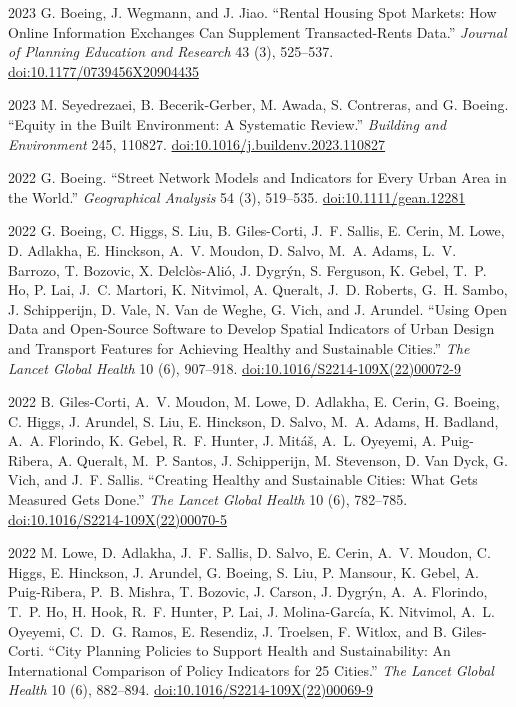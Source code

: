 \documentclass[11pt,letterpaper]{report} %
\begin{document}
\begin{tablist}
        \item[2023] \tab{}G. Boeing, J. Wegmann, and J. Jiao. \enquote{Rental Housing Spot Markets: How Online Information Exchanges Can Supplement Transacted-Rents Data.} \textit{Journal of Planning Education and Research} 43 (3), 525--537. \href{https://doi.org/10.1177/0739456X20904435}{doi:10.1177/0739456X20904435}

        \item[2023] \tab{}M. Seyedrezaei, B. Becerik-Gerber, M. Awada, S. Contreras, and G. Boeing. \enquote{Equity in the Built Environment: A Systematic Review.} \textit{Building and Environment} 245, 110827. \href{https://doi.org/10.1016/j.buildenv.2023.110827}{doi:10.1016/j.buildenv.2023.110827}

        \item[2022] \tab{}G. Boeing. \enquote{Street Network Models and Indicators for Every Urban Area in the World.} \textit{Geographical Analysis} 54 (3), 519--535. \href{https://doi.org/10.1111/gean.12281}{doi:10.1111/gean.12281}

        \item[2022] \tab{}G. Boeing, C. Higgs, S. Liu, B. Giles-Corti, J.~F. Sallis, E. Cerin, M. Lowe, D. Adlakha, E. Hinckson, A.~V. Moudon, D. Salvo, M.~A. Adams, L.~V. Barrozo, T. Bozovic, X. Delclòs-Alió, J. Dygrýn, S. Ferguson, K. Gebel, T.~P. Ho, P. Lai, J.~C. Martori, K. Nitvimol, A. Queralt, J.~D. Roberts, G.~H. Sambo, J. Schipperijn, D. Vale, N. Van de Weghe, G. Vich, and J. Arundel. \enquote{Using Open Data and Open-Source Software to Develop Spatial Indicators of Urban Design and Transport Features for Achieving Healthy and Sustainable Cities.} \textit{The Lancet Global Health} 10 (6), 907--918. \href{https://doi.org/10.1016/S2214-109X(22)00072-9}{doi:10.1016/S2214-109X(22)00072-9}

        \item[2022] \tab{}B. Giles-Corti, A.~V. Moudon, M. Lowe, D. Adlakha, E. Cerin, G. Boeing, C. Higgs, J. Arundel, S. Liu, E. Hinckson, D. Salvo, M.~A. Adams, H. Badland, A.~A. Florindo, K. Gebel, R.~F. Hunter, J. Mitáš, A.~L. Oyeyemi, A. Puig-Ribera, A. Queralt, M.~P. Santos, J. Schipperijn, M. Stevenson, D. Van Dyck, G. Vich, and J.~F. Sallis. \enquote{Creating Healthy and Sustainable Cities: What Gets Measured Gets Done.} \textit{The Lancet Global Health} 10 (6), 782--785. \href{https://doi.org/10.1016/S2214-109X(22)00070-5}{doi:10.1016/S2214-109X(22)00070-5}

        \item[2022] \tab{}M. Lowe, D. Adlakha, J.~F. Sallis, D. Salvo, E. Cerin, A.~V. Moudon, C. Higgs, E. Hinckson, J. Arundel, G. Boeing, S. Liu, P. Mansour, K. Gebel, A. Puig-Ribera, P.~B. Mishra, T. Bozovic, J. Carson, J. Dygrýn, A.~A. Florindo, T.~P. Ho, H. Hook, R.~F. Hunter, P. Lai, J. Molina-García, K. Nitvimol, A.~L. Oyeyemi, C.~D.~G. Ramos, E. Resendiz, J. Troelsen, F. Witlox, and B. Giles-Corti. \enquote{City Planning Policies to Support Health and Sustainability: An International Comparison of Policy Indicators for 25 Cities.}  \textit{The Lancet Global Health} 10 (6), 882--894. \href{https://doi.org/10.1016/S2214-109X(22)00069-9}{doi:10.1016/S2214-109X(22)00069-9}


\end{tablist}
\end{document}
